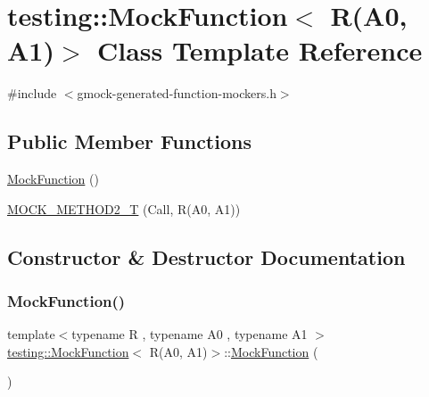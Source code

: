 \hypertarget{classtesting_1_1_mock_function_3_01_r_07_a0_00_01_a1_08_4}{}\section{testing\+:\+:Mock\+Function$<$ R(A0, A1)$>$ Class Template Reference}
\label{classtesting_1_1_mock_function_3_01_r_07_a0_00_01_a1_08_4}


{\ttfamily \#include $<$gmock-\/generated-\/function-\/mockers.\+h$>$}

\subsection*{Public Member Functions}
\begin{DoxyCompactItemize}
\item 
\hyperlink{classtesting_1_1_mock_function_3_01_r_07_a0_00_01_a1_08_4_a6a2575d43e9ec4f5d51cd53edbec7f82}{Mock\+Function} ()
\item 
\hyperlink{classtesting_1_1_mock_function_3_01_r_07_a0_00_01_a1_08_4_a5a4d673a3252cab866f0a4fa97486190}{M\+O\+C\+K\+\_\+\+M\+E\+T\+H\+O\+D2\+\_\+T} (Call, R(A0, A1))
\end{DoxyCompactItemize}


\subsection{Constructor \& Destructor Documentation}
\mbox{\label{classtesting_1_1_mock_function_3_01_r_07_a0_00_01_a1_08_4_a6a2575d43e9ec4f5d51cd53edbec7f82}} 
\subsubsection{\texorpdfstring{Mock\+Function()}{MockFunction()}}
{\footnotesize\ttfamily template$<$typename R , typename A0 , typename A1 $>$ \\
\hyperlink{classtesting_1_1_mock_function}{testing\+::\+Mock\+Function}$<$ R(A0, A1)$>$\+::\hyperlink{classtesting_1_1_mock_function}{Mock\+Function} (\begin{DoxyParamCaption}{ }\end{DoxyParamCaption})\hspace{0.3cm}{\ttfamily [inline]}}



